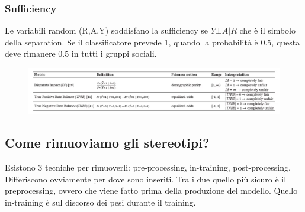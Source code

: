 \subsubsection{Sufficiency}
Le variabili random (R,A,Y) soddisfano la sufficiency se $Y \bot A |R$ che è il simbolo della separation. Se il classificatore prevede 1, quando la probabilità è 0.5, questa deve rimanere 0.5 in tutti i gruppi sociali.
\\
\begin{figure}[th]
    \centering
    \includegraphics[scale=0.6]{MLOps/img/metriche.png}
\end{figure}

\subsection{Come rimuoviamo gli stereotipi?}
Esistono 3 tecniche per rimuoverli: pre-processing, in-training, post-processing. Differiscono ovviamente per dove sono inseriti. Tra i due quello più sicuro è il preprocessing, ovvero che viene fatto prima della produzione del modello. Quello in-training è sul discorso dei pesi durante il training. 